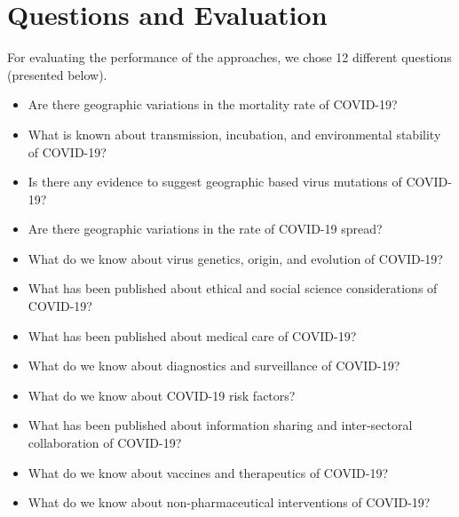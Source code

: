 \documentclass[sigconf,natbib=false]{acmart}
\begin{document}

\section{Questions and Evaluation}

For evaluating the performance of the approaches, we chose 12 different
questions (presented below).

\begin{itemize}
  \item Are there geographic variations in the mortality rate of COVID-19?

  \item What is known about transmission, incubation, and environmental
        stability of COVID-19?

  \item Is there any evidence to suggest geographic based virus mutations of
        COVID-19?

  \item Are there geographic variations in the rate of COVID-19 spread?

  \item What do we know about virus genetics, origin, and evolution of
        COVID-19?

  \item What has been published about ethical and social science considerations
        of COVID-19?

  \item What has been published about medical care of COVID-19?

  \item What do we know about diagnostics and surveillance of COVID-19?

  \item What do we know about COVID-19 risk factors?

  \item What has been published about information sharing and inter-sectoral
        collaboration of COVID-19?

  \item What do we know about vaccines and therapeutics of COVID-19?

  \item What do we know about non-pharmaceutical interventions of COVID-19?
\end{itemize}
\end{document}
